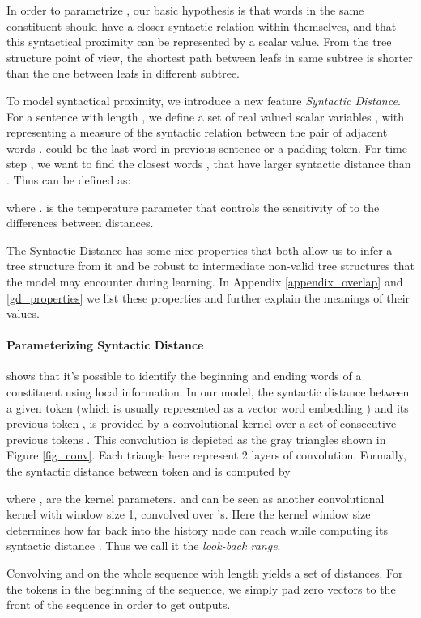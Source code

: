 \documentclass{article} \usepackage{iclr2018_conference,times}
\begin{document}
In order to parametrize , our basic hypothesis is that words in the same constituent should have a closer syntactic relation within themselves, and that this syntactical proximity can be represented by a scalar value. From the tree structure point of view, the shortest path between leafs in same subtree is shorter than the one between leafs in different subtree. 

To model syntactical proximity, we introduce a new feature \emph{Syntactic Distance}. For a sentence with length , we define a set of  real valued scalar variables , with  representing a measure of the syntactic relation between the pair of adjacent words .  could be the last word in previous sentence or a padding token. For time step , we want to find the closest words , that have larger syntactic distance than . Thus  can be defined as:

where .  is the temperature parameter that controls the sensitivity of  to the differences between distances.

The Syntactic Distance has some nice properties that both allow us to infer a tree structure from it and be robust to intermediate non-valid tree structures that the model may encounter during learning. In Appendix \ref{appendix_overlap} and \ref{gd_properties} we list these properties and further explain the meanings of their values.

\paragraph{Parameterizing Syntactic Distance}
\cite{roark2008classifying} shows that it's possible to identify the beginning and ending words of a constituent using local information. In our model, the syntactic distance between a given token (which is usually represented as a vector word embedding ) and its previous token , is provided by a convolutional kernel over a set of consecutive previous tokens . This convolution is depicted as the gray triangles shown in Figure \ref{fig_conv}. Each triangle here represent 2 layers of convolution. Formally, the syntactic distance  between token  and  is computed by


where ,  are the kernel parameters.  and  can be seen as another convolutional kernel with window size 1, convolved over 's. Here the kernel window size  determines how far back into the history node  can reach while computing its syntactic distance . Thus we call it the \emph{look-back range}. 

Convolving  and  on the whole sequence with length  yields a set of distances. For the tokens in the beginning of the sequence, we simply pad  zero vectors to the front of the sequence in order to get  outputs.
\end{document}
